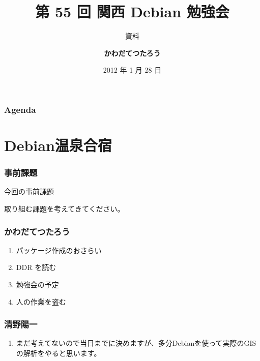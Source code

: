 \documentclass[cjk,dvipdfmx,10pt,%
hyperref={bookmarks=true,bookmarksnumbered=true,bookmarksopen=false,%
colorlinks=false,%
pdftitle={第 55 回 関西 Debian 勉強会＠Debian 温泉合宿},%
pdfauthor={倉敷・のがた・佐々木・かわだ},%
pdfsubject={資料},%
}]{beamer}
\title{第 55 回 関西 Debian 勉強会}
\subtitle{{\small{資料}}}
\author[かわだ てつたろう]{{\large\textbf{かわだてつたろう}}}
\institute[Debian JP]{{\normalsize\texttt{関西Debian勉強会}}}
\date{{\small 2012 年 1 月 28 日}}
\begin{document}
\settitleslide
\begin{frame}
\titlepage
\end{frame}
\setdefaultslide

\begin{frame}[fragile]
\frametitle{Agenda}
\tableofcontents
\end{frame}

\section{Debian温泉合宿}









\begin{frame}[fragile]
\frametitle{事前課題}
\begin{block}{今回の事前課題}
  \begin{description}
  \item 取り組む課題を考えてきてください。 
  \end{description}
\end{block}
\end{frame}


\begin{frame}[fragile]
  \frametitle{ かわだてつたろう }
  \begin{enumerate}
  \item パッケージ作成のおさらい
  \item DDR を読む
  \item 勉強会の予定
  \item 人の作業を盗む
  \end{enumerate}
\end{frame}

\begin{frame}[fragile]
  \frametitle{ 清野陽一 }
  \begin{enumerate}
  \item まだ考えてないので当日までに決めますが、多分Debianを使って実際のGISの解析をやると思います。
  \end{enumerate}
\end{frame}
\end{document}
